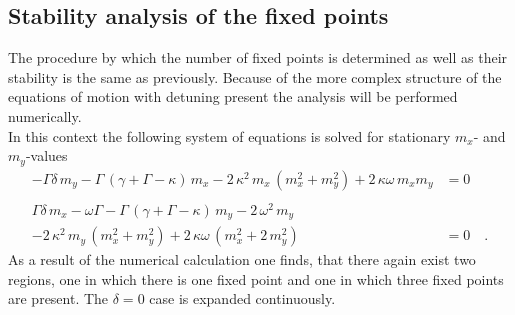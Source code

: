 \subsection[stability in general]{Stability analysis of the fixed points}\label{sec:stab_3D}
The procedure by which the number of fixed points is determined as well as their stability is the same as previously. Because of the more complex structure of the equations of motion with detuning present the analysis will be performed numerically.\\
In this context the following system of equations is solved for stationary $m_x$- and $m_y$-values
\begin{align*}
    -\Gamma\delta\,m_y-\Gamma\,(\gamma+\Gamma-\kappa)\,m_x-2\,\kappa^2\,m_x\,( m_x^2+ m_y^2)+2\,\kappa\omega\,m_xm_y  &=0\\\\
    \Gamma\delta\,m_x-\omega\Gamma-\Gamma\,(\gamma+\Gamma-\kappa)\,m_y-2\,\omega^2\,m_y&\\
    -2\,\kappa^2\,m_y\,( m_x^2+ m_y^2)+2\,\kappa\omega\,(m_x^2+2\,m_y^2)  &=0\quad.
\end{align*}
As a result of the numerical calculation one finds, that there again exist two regions, one in which there is one fixed point and one in which three fixed points are present. The $\delta=0$ case is expanded continuously.
